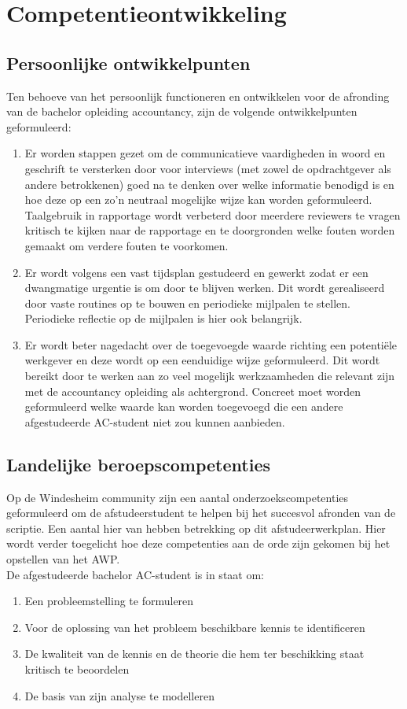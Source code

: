 \documentclass[10pt,a4paper,oneside]{report}
\begin{document}
\chapter{Competentieontwikkeling}
    \section{Persoonlijke ontwikkelpunten}
Ten behoeve van het persoonlijk functioneren en ontwikkelen voor de afronding van de bachelor opleiding accountancy, zijn de volgende ontwikkelpunten geformuleerd:
\begin{enumerate}
    \item Er worden stappen gezet om de communicatieve vaardigheden in woord en geschrift te versterken door voor interviews (met zowel de opdrachtgever als andere betrokkenen) goed na te denken over welke informatie benodigd is en hoe deze op een zo'n neutraal mogelijke wijze kan worden geformuleerd. Taalgebruik in rapportage wordt verbeterd door meerdere reviewers te vragen kritisch te kijken naar de rapportage en te doorgronden welke fouten worden gemaakt om verdere fouten te voorkomen. 
    \item Er wordt volgens een vast tijdsplan gestudeerd en gewerkt zodat er een dwangmatige urgentie is om door te blijven werken. Dit wordt gerealiseerd door vaste routines op te bouwen en periodieke mijlpalen te stellen. Periodieke reflectie op de mijlpalen is hier ook belangrijk.
    \item Er wordt beter nagedacht over de toegevoegde waarde richting een potentiële werkgever en deze wordt op een eenduidige wijze geformuleerd. Dit wordt bereikt door te werken aan zo veel mogelijk werkzaamheden die relevant zijn met de accountancy opleiding als achtergrond. Concreet moet worden geformuleerd welke waarde kan worden toegevoegd die een andere afgestudeerde AC-student niet zou kunnen aanbieden.
\end{enumerate}

\newpage
    \section{Landelijke beroepscompetenties}
Op de Windesheim community zijn een aantal onderzoekscompetenties geformuleerd om de afstudeerstudent te helpen bij het succesvol afronden van de scriptie. Een aantal hier van hebben betrekking op dit afstudeerwerkplan. Hier wordt verder toegelicht hoe deze competenties aan de orde zijn gekomen bij het opstellen van het AWP. \\
De afgestudeerde bachelor AC-student is in staat om: 
\begin{enumerate}
    \item Een probleemstelling te formuleren
    \item Voor de oplossing van het probleem beschikbare kennis te identificeren
    \item De kwaliteit van de kennis en de theorie die hem ter beschikking staat kritisch te beoordelen
    \item De basis van zijn analyse te modelleren
\end{enumerate}
\end{document}
